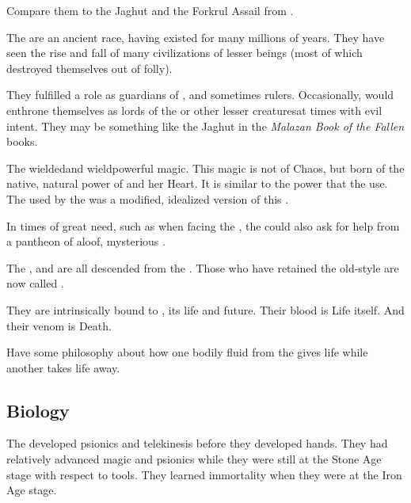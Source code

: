 Compare them to the Jaghut and the Forkrul Assail from \cite{StevenEriksonIanCameronEsslemont:MalazanBookoftheFallen}.

The \ophidians{} are an ancient race, having existed for many millions of years. 
They have seen the rise and fall of many civilizations of lesser beings (most of which destroyed themselves out of folly). 

They fulfilled a role as guardians of \Miith{}, and sometimes rulers. Occasionally, \ophidians{} would enthrone themselves as lords of the \nephilim{} or other lesser creatures\dash at times with evil intent. They may be something like the Jaghut in the \emph{Malazan Book of the Fallen} books. 

The \ophidians{} wielded\dash and wield\dash powerful magic. 
This magic is not of Chaos, but born of the native, natural power of \Miith{} and her Heart. 
It is similar to the \Wylde{} power that the  use. 
The  used by the  was a modified, idealized version of this \dweomer{}.

In times of great need, such as when facing the \xzaishann, the \ophidians{} could also ask for help from a pantheon of aloof, mysterious . 

The \dragons, \quiljaaran{} and \nagae{} are all descended from the \ophidians.
Those who have retained the old-style \ophidian{} are now called \quo{\trueophidians}. 


They are intrinsically bound to \Miith{}, its life and future. Their blood is Life itself. And their venom is Death. 

Have some philosophy about how one bodily fluid from the \ophidians{} gives life while another takes life away. 









\subsection{Biology}
The \ophidians{} developed psionics and telekinesis before they developed hands. 
They had relatively advanced magic and psionics while they were still at the Stone Age stage with respect to tools. 
They learned immortality when they were at the Iron Age stage. 





